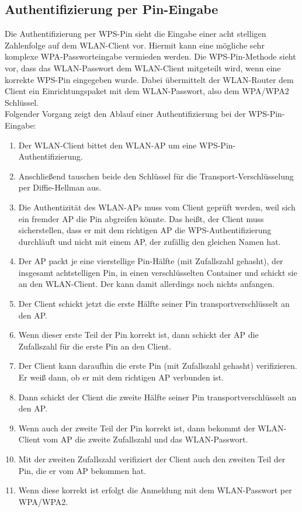 \subsection{Authentifizierung per Pin-Eingabe}

Die Authentifizierung per WPS-Pin sieht die Eingabe einer acht stelligen Zahlenfolge auf dem WLAN-Client vor. Hiermit kann eine mögliche sehr komplexe WPA-Passworteingabe vermieden werden. Die WPS-Pin-Methode sieht vor, dass das WLAN-Passwort dem WLAN-Client mitgeteilt wird, wenn eine korrekte WPS-Pin eingegeben wurde. Dabei übermittelt der WLAN-Router dem Client ein Einrichtungspaket mit dem WLAN-Passwort, also dem WPA/WPA2 Schlüssel. \\
Folgender Vorgang zeigt den Ablauf einer Authentifizierung bei der WPS-Pin-Eingabe:

\begin{enumerate}
	\item Der WLAN-Client bittet den WLAN-AP um eine WPS-Pin-Authentifizierung.
	\item Anschließend tauschen beide den Schlüssel für die Transport-Verschlüsselung per Diffie-Hellman aus.
	\item Die Authentizität des WLAN-APs muss vom Client geprüft werden, weil sich ein fremder AP die Pin abgreifen könnte. Das heißt, der Client muss sicherstellen, dass er mit dem richtigen AP die WPS-Authentifizierung durchläuft und nicht mit einem AP, der zufällig den gleichen Namen hat.
	\item Der AP packt je eine vierstellige Pin-Hälfte (mit Zufallszahl gehasht), der insgesamt achtstelligen Pin, in einen verschlüsselten Container und schickt sie an den WLAN-Client. Der kann damit allerdings noch nichts anfangen.
	\item Der Client schickt jetzt die erste Hälfte seiner Pin transportverschlüsselt an den AP.
	\item Wenn dieser erste Teil der Pin korrekt ist, dann schickt der AP die Zufallszahl für die erste Pin an den Client.
	\item Der Client kann daraufhin die erste Pin (mit Zufallszahl gehasht) verifizieren. Er weiß dann, ob er mit dem richtigen AP verbunden ist.
	\item Dann schickt der Client die zweite Hälfte seiner Pin transportverschlüsselt an den AP.
	\item Wenn auch der zweite Teil der Pin korrekt ist, dann bekommt der WLAN-Client vom AP die zweite Zufallszahl und das WLAN-Passwort.
	\item Mit der zweiten Zufallszahl verifiziert der Client auch den zweiten Teil der Pin, die er vom AP bekommen hat.
	\item Wenn diese korrekt ist erfolgt die Anmeldung mit dem WLAN-Passwort per WPA/WPA2.
\end{enumerate}

